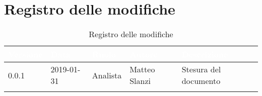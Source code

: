 \newpage

\section{Registro delle modifiche}

\begin{center}
\begin{longtable}[c]{|m{}|m{}|m{}|m{}|p{}|}
\hline
\rowcolor{bluelogo}\textbf{\textcolor{white}{Versione}} & \textbf{\textcolor{white}{Data}} & \textbf{\textcolor{white}{Ruolo}} & \textbf{\textcolor{white}{Autore}} & \textbf{\textcolor{white}{Descrizione}}\\
\hline 
\endfirsthead
0.0.1 & 2019-01-31 & Analista & Matteo Slanzi & Stesura del documento \\
\hline
\caption{Registro delle modifiche}
\end{longtable}
\end{center}